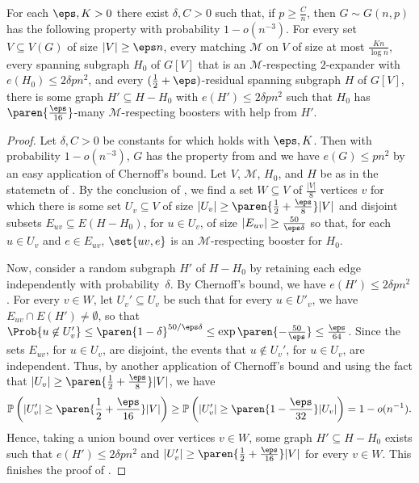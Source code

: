 \documentclass[10pt,a4paper,reqno]{amsart}
\begin{document}
\begin{lemma}
  \label{lem:find-sparse-helper-for-expander}
  For each $\eps, K > 0$ there exist $\delta, C > 0$ such that, if $p \geq \frac{C}{n}$, then $G \sim G(n, p)$ has the following property with probability $1 - o(n^{-3})$. For every set $V \subseteq V(G)$ of size $|V| \geq \eps n$, every matching $\mathcal{M}$ on $V$ of size at most $\frac{K n}{\log{n}}$, every spanning subgraph $H_0$ of $G[V]$ that is an $\mathcal{M}$-respecting $2$-expander with $e(H_0) \leq 2\delta pn^2$, and every $(\frac{1}{2} + \eps)$-residual spanning subgraph $H$ of $G[V]$, there is some graph $H' \subseteq H - H_0$ with $e(H') \leq 2\delta pn^2$ such that $H_0$ has $\paren{\frac{\eps}{16}}$-many $\mathcal{M}$-respecting boosters with help from $H'$.
\end{lemma}
\begin{proof}
Let $\delta, C > 0$ be constants for which  holds with $\eps, K$. Then with probability $1 - o(n^{-3})$, $G$ has the property from  and we have $e(G)\le pn^2$ by an easy application of Chernoff's bound. Let $V$, $\mathcal{M}$, $H_0$, and $H$ be as in the statemetn of . By the conclusion of , we find a set $W \subseteq V$ of $\frac{|V|}{8}$ vertices $v$ for which there is some set $U_v \subseteq V$ of size $|U_v| \geq \paren{\frac{1}{2} + \frac{\eps}{8}}|V|$ and disjoint subsets $E_{uv} \subseteq E(H - H_0)$, for $u \in U_v$, of size $|E_{uv}| \geq \frac{50}{\eps \delta}$ so that, for each $u \in U_v$ and $e \in E_{uv}$, $\set{uv, e}$ is an $\mathcal{M}$-respecting booster for $H_0$.

Now, consider a random subgraph $H'$ of $H - H_0$ by retaining each edge independently with probability~$\delta$. By Chernoff's bound, \whp we have $e(H') \leq 2\delta pn^2$. For every $v \in W$, let $U_v' \subseteq U_v$ be such that for every $u\in U'_v$, we have $E_{uv} \cap E(H') \neq \emptyset$, so that $\Prob{u \not\in U_v'} \leq \paren{1 - \delta}^{50 /\eps\delta} \leq \exp{\paren{-\frac{50}{\eps}}} \leq \frac{\eps}{64}$. Since the sets $E_{uv}$, for $u \in U_v$, are disjoint, the events that $u \not\in U_v'$, for $u \in U_v$, are independent. Thus, by another application of Chernoff's bound and using the fact that $|U_v| \geq \paren{\frac{1}{2} + \frac{\eps}{8}}|V|$, we have
\begin{equation*}
    \mathbb{P}\left(|U_v'| \geq \paren{\frac{1}{2} + \frac{\eps}{16}}|V|\right) \geq \mathbb{P}\left(|U_v'| \geq \paren{1 - \frac{\eps}{32}} |U_v|\right) = 1 - o(n^{-1}).
\end{equation*}
Hence, taking a union bound over vertices $v\in W$, \whp some graph $H' \subseteq H - H_0$ exists such that $e(H') \leq 2\delta pn^2$ and $|U'_v| \geq \paren{\frac{1}{2} + \frac{\eps}{16}} |V|$ for every $v \in W$. This finishes the proof of .
\end{proof}
\end{document}
